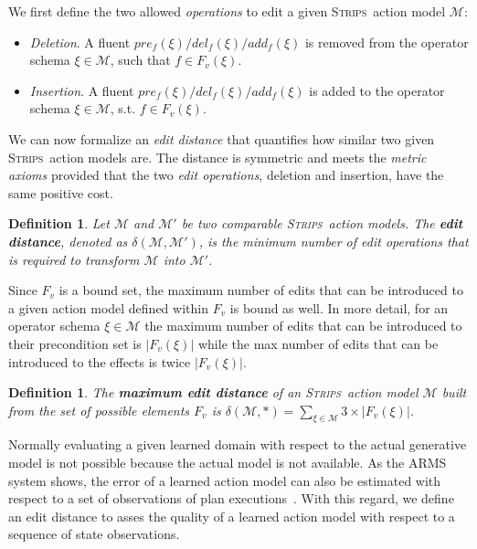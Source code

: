 \documentclass[3p,times]{elsarticle}
\newtheorem{mydefinition}[mytheorem]{Definition}
\newcommand{\strips}{\textsc{Strips}}     %
\begin{document}
We first define the two allowed \emph{operations} to edit a given \strips\ action model $\mathcal{M}$:
\begin{itemize}
\item {\em Deletion}. A fluent $pre_f(\xi)/del_f(\xi)/add_f(\xi)$ is removed from the operator schema $\xi\in\mathcal{M}$, such that $f\in F_v(\xi)$.
\item {\em Insertion}. A fluent $pre_f(\xi)/del_f(\xi)/add_f(\xi)$ is added to the operator schema $\xi\in\mathcal{M}$, s.t. $f\in F_v(\xi)$.
\end{itemize}

We can now formalize an {\em edit distance} that quantifies how similar two given \strips\ action models are. The distance is symmetric and meets the {\em metric axioms} provided that the two {\em edit operations}, deletion and insertion, have the same positive cost.

\begin{mydefinition}
  Let $\mathcal{M}$ and $\mathcal{M}'$ be two {\em comparable} \strips\ action models. The {\bf edit distance}, denoted as $\delta(\mathcal{M},\mathcal{M}')$, is the minimum number of {\em edit operations} that is required to transform $\mathcal{M}$ into $\mathcal{M}'$.
\end{mydefinition}

Since $F_v$ is a bound set, the maximum number of edits that can be introduced to a given action model defined within $F_v$ is bound as well. In more detail, for an operator schema $\xi\in\mathcal{M}$ the maximum number of edits that can be introduced to their precondition set is $|F_v(\xi)|$ while the max number of edits that can be introduced to the effects is twice $|F_v(\xi)|$.
\begin{mydefinition}
The \textbf{maximum edit distance} of an \strips\ action model $\mathcal{M}$ built from the set of possible elements $F_v$ is $\delta(\mathcal{M},*)=\sum_{\xi\in\mathcal{M}} 3\times|F_v(\xi)|$.
\end{mydefinition}

Normally evaluating a given learned domain with respect to the actual generative model is not possible because the actual model is not available. As the ARMS system shows, the error of a learned action model can also be estimated with respect to a set of observations of plan executions~\cite{yang2007learning}. With this regard, we define an edit distance to asses the quality of a learned action model with respect to a sequence of state observations.
\end{document}
